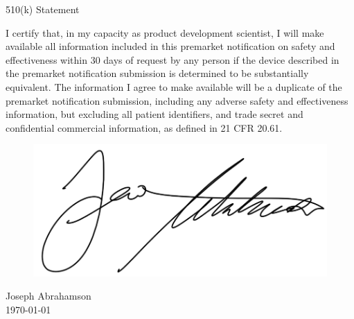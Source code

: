 \newpage
{}
\singlespacing
\begin{center}
  \large{510(k) Statement}
\end{center}

\onehalfspacing


I certify that, in my capacity as product development scientist, I
will make available all information included in this premarket
notification on safety and effectiveness within 30 days of request by
any person if the device described in the premarket notification
submission is determined to be substantially equivalent. The
information I agree to make available will be a duplicate of the
premarket notification submission, including any adverse safety and
effectiveness information, but excluding all patient identifiers, and
trade secret and confidential commercial information, as defined in 21
CFR 20.61.

\begin{figure}[H]
  \includegraphics[width=0.35\linewidth]{imgs/ja-sig}
\end{figure}

\noindent Joseph Abrahamson \\
\today


